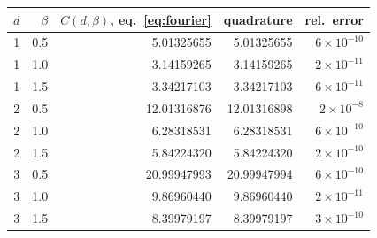 \begin{tabular}{rrrrr}
\toprule
$d$ & $\beta$ & $C(d,\beta)$, eq.~\eqref{eq:fourier} & quadrature & rel.\ error\\
\midrule
1 & 0.5 & 5.01325655 & 5.01325655 & $6\times10^{-10}$\\
1 & 1.0 & 3.14159265 & 3.14159265 & $2\times10^{-11}$\\
1 & 1.5 & 3.34217103 & 3.34217103 & $6\times10^{-11}$\\
2 & 0.5 & 12.01316876 & 12.01316898 & $2\times10^{-8}$\\
2 & 1.0 & 6.28318531 & 6.28318531 & $6\times10^{-10}$\\
2 & 1.5 & 5.84224320 & 5.84224320 & $2\times10^{-10}$\\
3 & 0.5 & 20.99947993 & 20.99947994 & $6\times10^{-10}$\\
3 & 1.0 & 9.86960440 & 9.86960440 & $2\times10^{-11}$\\
3 & 1.5 & 8.39979197 & 8.39979197 & $3\times10^{-10}$\\
\bottomrule
\end{tabular}
